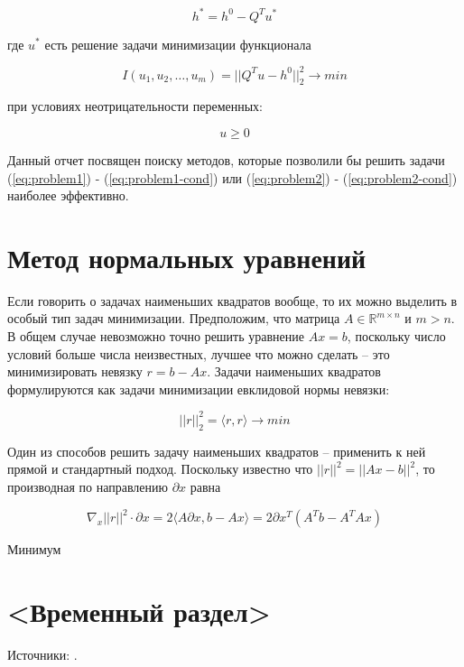 \documentclass[a4paper, 12pt, titlepage]{article}
\theoremstyle{definition}
\theoremstyle{plain}
\theoremstyle{plain}
\begin{document}
\begin{equation}
\label{eq:problem2}
 h^{*} = h^{0} - Q^{T} u^{*}
\end{equation}

где $u^{*}$ есть решение задачи минимизации функционала

\begin{equation}
\label{eq:problem2-cond}
 I(u_{1}, u_{2}, \ldots, u_{m}) = ||Q^{T} u - h^{0}||_{2}^{2} \to min
\end{equation}

при условиях неотрицательности переменных:

\begin{equation}
 u \geq 0
\end{equation}

Данный отчет посвящен поиску методов, которые позволили бы решить задачи
(\ref{eq:problem1}) - (\ref{eq:problem1-cond}) или (\ref{eq:problem2}) -
(\ref{eq:problem2-cond}) наиболее эффективно.

\section{Метод нормальных уравнений}

Если говорить о задачах наименьших квадратов вообще, то их можно выделить в
особый тип задач минимизации. Предположим, что матрица $A \in \mathbb{R}^{m
\times n}$ и $m > n$. В общем случае невозможно точно решить уравнение
$A x = b$, поскольку число условий больше числа неизвестных, лучшее что можно
сделать -- это минимизировать невязку $r = b - A x$. Задачи наименьших
квадратов формулируются как задачи минимизации евклидовой нормы невязки:

$$
||r||^{2}_{2} = \langle r, r \rangle \to min
$$

Один из способов решить задачу наименьших квадратов -- применить к ней прямой
и стандартный подход. Поскольку известно что $||r||^{2} = ||A x - b||^{2}$, то
производная по направлению $\partial x$ равна

$$
\nabla_{x} ||r||^{2} \cdot \partial x = 2 \langle A \partial x, b - A x\rangle =
2 \partial x^{T} (A^{T} b - A^{T} A x)
$$

Минимум

\section{<Временный раздел>}

Источники: \cite{BertsekasTsitsiklis1989, BierlaireTointTuyttens1991,
CantarellaPiatek2004, ChenDonohoSaunders2001, Golub1965, Lanczos1950,
PaigeSaunders1982, Saunders2013}.

\newpage


\end{document}
